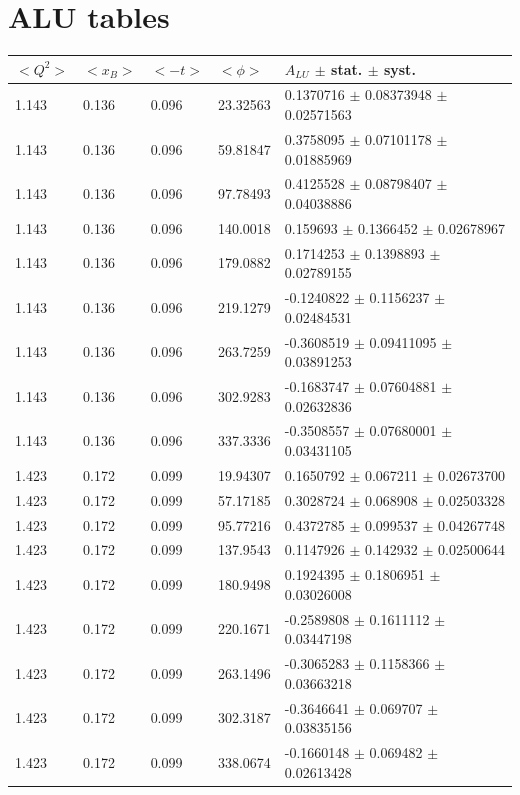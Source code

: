 \chapter{ALU tables}
\begin{table}[!h]
   \begin{center}
      \begin{tabular}{||l|l|l|l|l||}
         \hline
 $<Q^{2}>$ & $<x_{B}>$ & $<-t>$ & $<\phi>$ & $A_{LU}$ $\pm$ stat. $\pm$ syst.\\
         \hline
         1.143 & 0.136 & 0.096 &  23.32563   &    0.1370716   $\pm$   
         0.08373948 $\pm$   0.02571563 \\
         1.143 & 0.136 & 0.096 &  59.81847   &    0.3758095  $\pm$   0.07101178  $\pm$   0.01885969 \\
         1.143 & 0.136 & 0.096 &  97.78493   &    0.4125528  $\pm$   0.08798407  $\pm$   0.04038886 \\
         1.143 & 0.136 & 0.096 &  140.0018   &    0.159693   $\pm$   0.1366452   $\pm$   0.02678967 \\
         1.143 & 0.136 & 0.096 &  179.0882   &    0.1714253  $\pm$   0.1398893   $\pm$   0.02789155 \\
         1.143 & 0.136 & 0.096 &  219.1279   &   -0.1240822  $\pm$   0.1156237   $\pm$   0.02484531 \\
         1.143 & 0.136 & 0.096 &  263.7259   &   -0.3608519  $\pm$   0.09411095  $\pm$   0.03891253 \\
         1.143 & 0.136 & 0.096 &  302.9283   &   -0.1683747  $\pm$   0.07604881  $\pm$   0.02632836 \\
         1.143 & 0.136 & 0.096 &  337.3336   &   -0.3508557  $\pm$   0.07680001  $\pm$   0.03431105 \\
         \hline                                                                          
         1.423 & 0.172 & 0.099 &  19.94307   &    0.1650792  $\pm$   0.067211    $\pm$   0.02673700 \\
         1.423 & 0.172 & 0.099 &  57.17185   &    0.3028724  $\pm$   0.068908    $\pm$   0.02503328 \\
         1.423 & 0.172 & 0.099 &  95.77216   &    0.4372785  $\pm$   0.099537    $\pm$   0.04267748 \\
         1.423 & 0.172 & 0.099 &  137.9543   &    0.1147926  $\pm$   0.142932    $\pm$   0.02500644 \\
         1.423 & 0.172 & 0.099 &  180.9498   &    0.1924395  $\pm$   0.1806951   $\pm$   0.03026008 \\
         1.423 & 0.172 & 0.099 &  220.1671   &   -0.2589808  $\pm$   0.1611112   $\pm$   0.03447198 \\
         1.423 & 0.172 & 0.099 &  263.1496   &   -0.3065283  $\pm$   0.1158366   $\pm$   0.03663218 \\
         1.423 & 0.172 & 0.099 &  302.3187   &   -0.3646641  $\pm$   0.069707    $\pm$   0.03835156 \\
         1.423 & 0.172 & 0.099 &  338.0674   &   -0.1660148  $\pm$   0.069482    $\pm$   0.02613428 \\
         \hline
                                                                        

\end{tabular}
\end{center}
\end{table}
